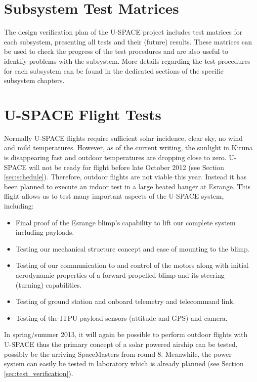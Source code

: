 \section{Subsystem Test Matrices}
%
The design verification plan of the \ac{U-SPACE} project includes test matrices for each subsystem, presenting all tests and their (future) results. These matrices can be used to check the progress of the test procedures and are also useful to identify problems with the subsystem. More details regarding the test procedures for each subsystem can be found in the dedicated sections of the specific subsystem chapters.
%
%
\section{U-SPACE Flight Tests}
%
Normally \ac{U-SPACE} flights require sufficient solar incidence, clear sky, no wind and mild temperatures. However, as of the current writing, the sunlight in Kiruna is disappearing fast and outdoor temperatures are dropping close to zero. \ac{U-SPACE} will not be ready for flight before late October 2012 (see Section \ref{sec:schedule}). Therefore, outdoor flights are not viable this year. Instead it has been planned to execute an indoor test in a large heated hanger at Esrange. This flight allows us to test many important aspects of the \ac{U-SPACE} system, including:
%
\begin{itemize}
\item Final proof of the Esrange blimp's capability to lift our complete system including payloads.
\item Testing our mechanical structure concept and ease of mounting to the blimp.
\item Testing of our communication to and control of the motors along with initial aerodynamic properties of a forward propelled blimp and its steering (turning) capabilities.
\item Testing of ground station and onboard telemetry and telecommand link.
\item Testing of the \ac{ITPU} payload sensors (attitude and GPS) and camera.
\end{itemize}
%
%
In spring/summer 2013, it will again be possible to perform outdoor flights with \ac{U-SPACE} thus the primary concept of a solar powered airship can be tested, possibly be the arriving SpaceMasters from round 8. Meanwhile, the power system can easily be tested in laboratory which is already planned (see Section \ref{sec:test_verification}).
%